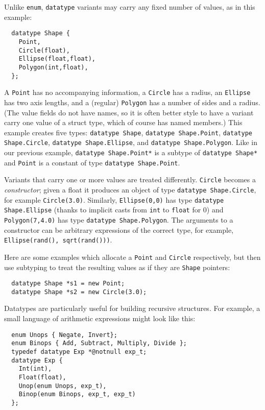 Unlike \texttt{enum}, \texttt{datatype} variants may carry any fixed
number of values, as in this example:
\begin{verbatim}
  datatype Shape {
    Point,
    Circle(float),
    Ellipse(float,float),
    Polygon(int,float),
  };
\end{verbatim}

A \texttt{Point} has no accompanying information, a \texttt{Circle} has a
radius, an \texttt{Ellipse} has two axis lengths, and a (regular)
\texttt{Polygon} has a number of sides and a radius.  (The value fields
do not have names, so it is often better style to have a variant carry
one value of a struct type, which of course has named members.)  This
example creates five types: \texttt{datatype Shape},
\texttt{datatype Shape.Point}, \texttt{datatype Shape.Circle},
\texttt{datatype Shape.Ellipse}, and \texttt{datatype Shape.Polygon}.  Like in
our previous example, \texttt{datatype Shape.Point*} is a subtype of
\texttt{datatype Shape*} and \texttt{Point} is a constant of
type \texttt{datatype Shape.Point}.

Variants that carry one or more values are treated differently.
\texttt{Circle} becomes a \textit{constructor}; given a float it produces an
object of type \texttt{datatype Shape.Circle}, for example \texttt{Circle(3.0)}.
Similarly, \texttt{Ellipse(0,0)} has type \texttt{datatype Shape.Ellipse}
(thanks to implicit casts from \texttt{int} to \texttt{float} for 0) and
\texttt{Polygon(7,4.0)} has type \texttt{datatype Shape.Polygon}.  The
arguments to a constructor can be arbitrary expressions of the correct
type, for example, \texttt{Ellipse(rand(), sqrt(rand()))}.

Here are some examples which allocate a \texttt{Point} and \texttt{Circle}
respectively, but then use subtyping to treat the resulting values
as if they are \texttt{Shape} pointers:
\begin{verbatim}
  datatype Shape *s1 = new Point;
  datatype Shape *s2 = new Circle(3.0);
\end{verbatim}

Datatypes are particularly useful for building recursive structures.
For example, a small language of arithmetic expressions might look
like this:
\begin{verbatim}
  enum Unops { Negate, Invert};
  enum Binops { Add, Subtract, Multiply, Divide };
  typedef datatype Exp *@notnull exp_t;
  datatype Exp {
    Int(int),
    Float(float),
    Unop(enum Unops, exp_t),
    Binop(enum Binops, exp_t, exp_t)
  };
\end{verbatim}

